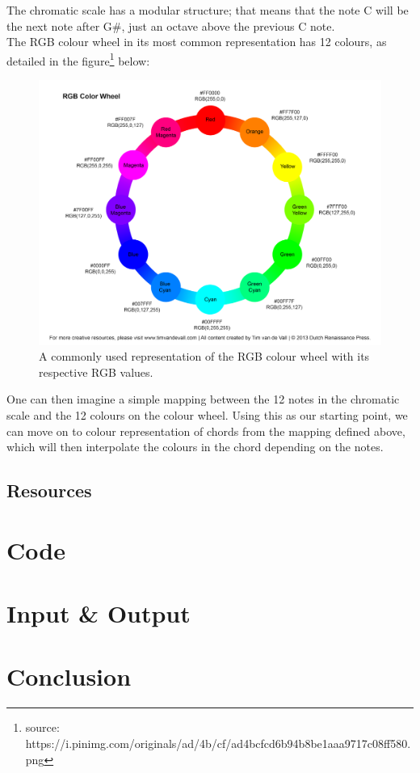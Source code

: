 \documentclass{article}
\begin{document}
The chromatic scale has a modular structure; that means that the note C will be the next note after G\#, just an octave above the previous C note.\\

The RGB colour wheel in its most common representation has 12 colours, as detailed in the figure\footnote{source: https://i.pinimg.com/originals/ad/4b/cf/ad4bcfcd6b94b8be1aaa9717c08ff580.png} below:

\begin{figure}
    \includegraphics[scale=0.3]{wheel.png}
    \caption{A commonly used representation of the RGB colour wheel with its respective RGB values.}
    \label{fig:wheel}
    \centering
\end{figure}

One can then imagine a simple mapping between the 12 notes in the chromatic scale and the 12 colours on the colour wheel. Using this as our starting point, we can move on to colour representation of chords from the mapping defined above, which will then interpolate the colours in the chord depending on the notes.

\subsection{Resources}
\section{Code}
\section{Input \& Output}
\section{Conclusion}

\printbibliography
\end{document}
